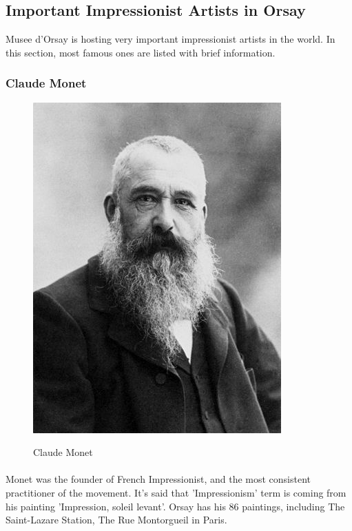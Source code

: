 \documentclass[
10pt, %
a4paper, %
oneside, %
headinclude,footinclude, %
BCOR5mm, %
]{scrartcl}
\theoremstyle{definition} %
\theoremstyle{plain} %
\theoremstyle{remark} %
\begin{document}
%
%


\subsection{Important Impressionist Artists in Orsay}
Musee d'Orsay is hosting very important impressionist artists in the world. In this section, most famous ones are listed with brief information.

\subsubsection{Claude Monet}
\begin{figure}[tbH]
\centering
{\includegraphics[width=.30\columnwidth]{Images/10.png}}
\caption[Claude Monet]{Claude Monet} %
\label{fig:claudeMonet}
\end{figure}
\paragraph{}

\paragraph{}
Monet was the founder of French Impressionist, and the most consistent practitioner of the movement. It's said that 'Impressionism' term is coming from his painting 'Impression, soleil levant'. Orsay has his 86 paintings, including The Saint-Lazare Station, The Rue Montorgueil in Paris.
\end{document}
